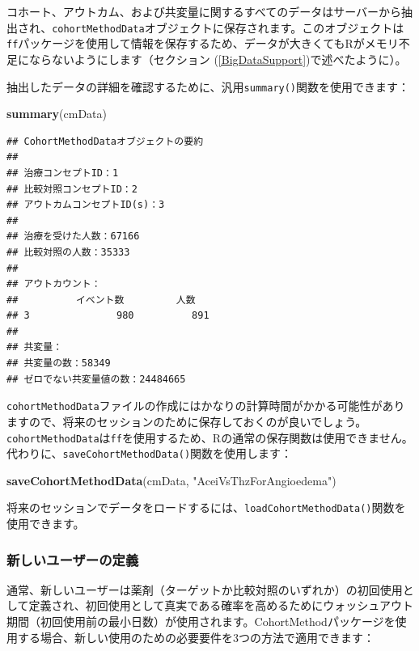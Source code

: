 \documentclass[
  11pt]{book}
\newenvironment{Shaded}{\begin{snugshade}}{\end{snugshade}}
\newcommand{\FunctionTok}[1]{\textcolor[rgb]{0.13,0.29,0.53}{\textbf{#1}}}
\newcommand{\NormalTok}[1]{#1}
\newcommand{\StringTok}[1]{\textcolor[rgb]{0.31,0.60,0.02}{#1}}
\theoremstyle{definition}
\theoremstyle{definition}
\theoremstyle{definition}
\theoremstyle{definition}
\theoremstyle{remark}
\begin{document}
コホート、アウトカム、および共変量に関するすべてのデータはサーバーから抽出され、\texttt{cohortMethodData}オブジェクトに保存されます。このオブジェクトは\texttt{ff}パッケージを使用して情報を保存するため、データが大きくてもRがメモリ不足にならないようにします（セクション (\ref{BigDataSupport})で述べたように）。

抽出したデータの詳細を確認するために、汎用\texttt{summary()}関数を使用できます：

\begin{Shaded}
\begin{Highlighting}[]
\FunctionTok{summary}\NormalTok{(cmData)}
\end{Highlighting}
\end{Shaded}

\begin{verbatim}
## CohortMethodDataオブジェクトの要約
## 
## 治療コンセプトID：1
## 比較対照コンセプトID：2
## アウトカムコンセプトID(s)：3
## 
## 治療を受けた人数：67166
## 比較対照の人数：35333
## 
## アウトカウント：
##          イベント数         人数
## 3               980          891
## 
## 共変量：
## 共変量の数：58349
## ゼロでない共変量値の数：24484665
\end{verbatim}

\texttt{cohortMethodData}ファイルの作成にはかなりの計算時間がかかる可能性がありますので、将来のセッションのために保存しておくのが良いでしょう。\texttt{cohortMethodData}は\texttt{ff}を使用するため、Rの通常の保存関数は使用できません。代わりに、\texttt{saveCohortMethodData()}関数を使用します：

\begin{Shaded}
\begin{Highlighting}[]
\FunctionTok{saveCohortMethodData}\NormalTok{(cmData, }\StringTok{"AceiVsThzForAngioedema"}\NormalTok{)}
\end{Highlighting}
\end{Shaded}

将来のセッションでデータをロードするには、\texttt{loadCohortMethodData()}関数を使用できます。

\subsubsection*{新しいユーザーの定義}\label{ux65b0ux3057ux3044ux30e6ux30fcux30b6ux30fcux306eux5b9aux7fa9}

通常、新しいユーザーは薬剤（ターゲットか比較対照のいずれか）の初回使用として定義され、初回使用として真実である確率を高めるためにウォッシュアウト期間（初回使用前の最小日数）が使用されます。CohortMethodパッケージを使用する場合、新しい使用のための必要要件を3つの方法で適用できます：
\end{document}

